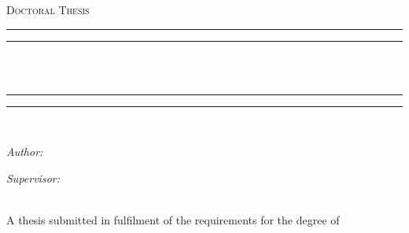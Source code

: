 \begin{titlepage}
\begin{center}

\textsc{\Large Doctoral Thesis}\\[0.5cm] %
\rule{\textwidth}{1.6pt}\vspace*{-\baselineskip}\vspace*{2pt} %
\rule{\textwidth}{0.4pt}\\[\baselineskip] %
{\huge \bfseries \ttitle}\\[0.5cm] %
\rule{\textwidth}{0.4pt}\vspace*{-\baselineskip}\vspace{3.2pt} %
\rule{\textwidth}{1.6pt}\\[\baselineskip] %

\begin{minipage}{0.4\textwidth}
\begin{flushleft} \large
\emph{Author:}\\
\href{https://www.physics.unsw.edu.au/staff/ana-andres-arroyo}{\authornames} %
\end{flushleft}
\end{minipage}
\begin{minipage}{0.4\textwidth}
\begin{flushright} \large
\emph{Supervisor:} \\
\href{https://www.physics.unsw.edu.au/staff/peter-reece}{\supname} %
\end{flushright}
\end{minipage}\\[1.2cm]
 
\large A thesis submitted in fulfilment of the requirements for the degree of \\ \degreename\\[0.3cm] %


\end{center}
\end{titlepage}
